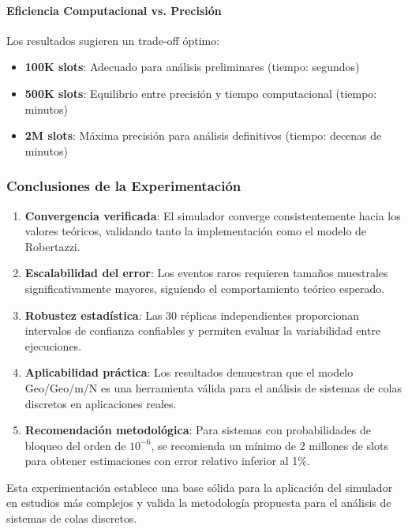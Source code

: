 \documentclass{article}
\begin{document}
\paragraph{Eficiencia Computacional vs. Precisión}
Los resultados sugieren un trade-off óptimo:
\begin{itemize}
    \item \textbf{100K slots}: Adecuado para análisis preliminares (tiempo: segundos)
    \item \textbf{500K slots}: Equilibrio entre precisión y tiempo computacional (tiempo: minutos)
    \item \textbf{2M slots}: Máxima precisión para análisis definitivos (tiempo: decenas de minutos)
\end{itemize}

\subsubsection{Conclusiones de la Experimentación}
\begin{enumerate}
    \item \textbf{Convergencia verificada}: El simulador converge consistentemente hacia los valores teóricos, validando tanto la implementación como el modelo de Robertazzi.
    \item \textbf{Escalabilidad del error}: Los eventos raros requieren tamaños muestrales significativamente mayores, siguiendo el comportamiento teórico esperado.
    \item \textbf{Robustez estadística}: Las 30 réplicas independientes proporcionan intervalos de confianza confiables y permiten evaluar la variabilidad entre ejecuciones.
    \item \textbf{Aplicabilidad práctica}: Los resultados demuestran que el modelo Geo/Geo/m/N es una herramienta válida para el análisis de sistemas de colas discretos en aplicaciones reales.
    \item \textbf{Recomendación metodológica}: Para sistemas con probabilidades de bloqueo del orden de $10^{-6}$, se recomienda un mínimo de 2 millones de slots para obtener estimaciones con error relativo inferior al 1\%.
\end{enumerate}

Esta experimentación establece una base sólida para la aplicación del simulador en estudios más complejos y valida la metodología propuesta para el análisis de sistemas de colas discretos.


\end{document}
